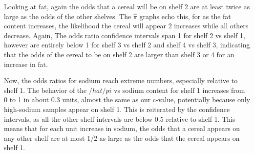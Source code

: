 \documentclass[11pt,]{article}
\begin{document}
Looking at fat, again the odds that a cereal will be on shelf 2 are at
least twice as large as the odds of the other shelves. The \(\hat{\pi}\)
graphs echo this, for as the fat content increases, the likelihood the
cereal will appear 2 increases while all others decrease. Again, The
odds ratio confidence intervals span 1 for shelf 2 vs shelf 1, however
are entirely below 1 for shelf 3 vs shelf 2 and shelf 4 vs shelf 3,
indicating that the odds of the cereal to be on shelf 2 are larger than
shelf 3 or 4 for an increase in fat.

Now, the odds ratios for sodium reach extreme numbers, especially
relative to shelf 1. The behavior of the \(/hat{/pi}\) vs sodium content
for shelf 1 increases from 0 to 1 in about 0.3 units, almost the same as
our c-value, potentially because only high-sodium samples appear on
shelf 1. This is reiterated by the confidence intervals, as all the
other shelf intervals are below 0.5 relative to shelf 1. This means that
for each unit increase in sodium, the odds that a cereal appears on any
other shelf are at most 1/2 as large as the odds that the cereal appears
on shelf 1.
\end{document}
